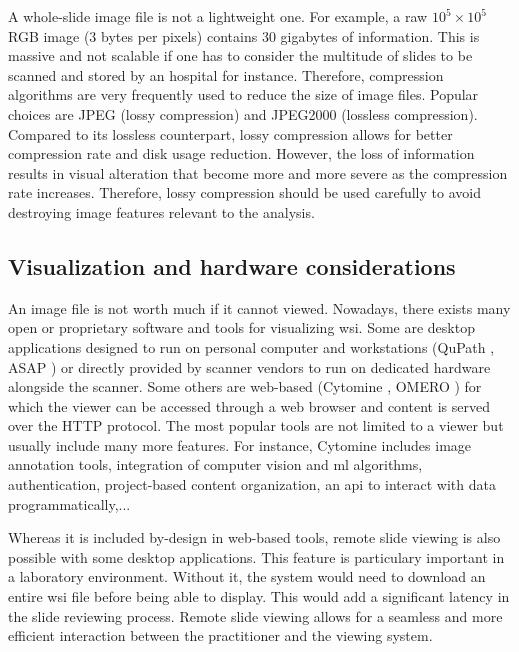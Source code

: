A whole-slide image file is not a lightweight one. For example, a raw $10^5 \times 10^5$ RGB image (3 bytes per pixels) contains 30 gigabytes of information. This is massive and not scalable if one has to consider the multitude of slides to be scanned and stored by an hospital for instance. Therefore, compression algorithms are very frequently used to reduce the size of image files. Popular choices are JPEG (lossy compression) and JPEG2000 (lossless compression). Compared to its lossless counterpart, lossy compression allows for better compression rate and disk usage reduction. However, the loss of information results in visual alteration that become more and more severe as the compression rate increases. Therefore, lossy compression should be used carefully to avoid destroying image features relevant to the analysis. 

\subsection{Visualization and hardware considerations}
\label{ssec:backdp:visualization}

An image file is not worth much if it cannot viewed. Nowadays, there exists many open or proprietary software and tools for visualizing \acrshort{wsi}. Some are desktop applications designed to run on personal computer and workstations (\eg QuPath \parencite{bankhead2017qupath}, ASAP \parencite{cpg2022asap}) or directly provided by scanner vendors to run on dedicated hardware alongside the scanner. Some others are web-based (\eg Cytomine \parencite{maree2016collaborative}, OMERO \parencite{allan2012omero}) for which the viewer can be accessed through a web browser and content is served over the HTTP protocol. The most popular tools are not limited to a viewer but usually include many more features. For instance, Cytomine includes image annotation tools, integration of computer vision and \acrlong{ml} algorithms, authentication, project-based content organization, an \acrshort{api} to interact with data programmatically,...

Whereas it is included by-design in web-based tools, remote slide viewing is also possible with some desktop applications. This feature is particulary important in a laboratory environment. Without it, the system would need to download an entire \acrshort{wsi} file before being able to display. This would add a significant latency in the slide reviewing process. Remote slide viewing allows for a seamless and more efficient interaction between the practitioner and the viewing system.


